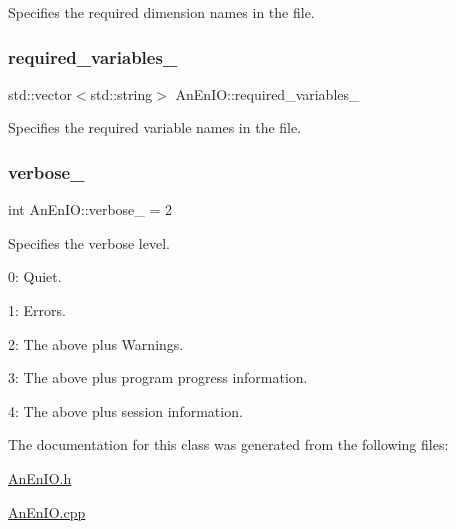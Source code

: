 Specifies the required dimension names in the file. \mbox{\label{class_an_en_i_o_a119dcb81d3811547f0e37d6c3752f0a7}} 
\subsubsection{\texorpdfstring{required\+\_\+variables\+\_\+}{required\_variables\_}}
{\footnotesize\ttfamily std\+::vector$<$std\+::string$>$ An\+En\+I\+O\+::required\+\_\+variables\+\_\+\hspace{0.3cm}{\ttfamily [protected]}}

Specifies the required variable names in the file. \mbox{\label{class_an_en_i_o_a4f6abd007730e4a8f54d57cc3572bd9e}} 
\subsubsection{\texorpdfstring{verbose\+\_\+}{verbose\_}}
{\footnotesize\ttfamily int An\+En\+I\+O\+::verbose\+\_\+ = 2\hspace{0.3cm}{\ttfamily [protected]}}

Specifies the verbose level.
\begin{DoxyItemize}
\item 0\+: Quiet.
\item 1\+: Errors.
\item 2\+: The above plus Warnings.
\item 3\+: The above plus program progress information.
\item 4\+: The above plus session information. 
\end{DoxyItemize}

The documentation for this class was generated from the following files\+:\begin{DoxyCompactItemize}
\item 
\mbox{\hyperlink{_an_en_i_o_8h}{An\+En\+I\+O.\+h}}\item 
\mbox{\hyperlink{_an_en_i_o_8cpp}{An\+En\+I\+O.\+cpp}}\end{DoxyCompactItemize}
